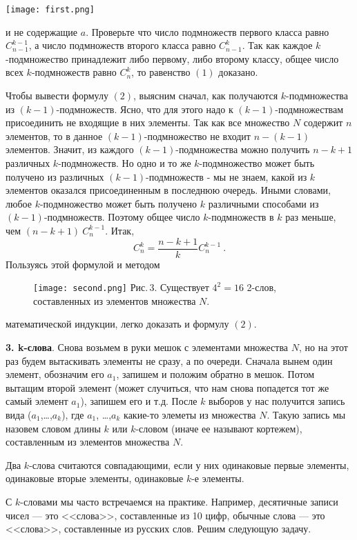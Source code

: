 \documentclass[11pt, a4paper, twocolumn]{report}
\begin{document}
\texttt{[image: first.png]}

 и не содержащие $a$. Проверьте что число подмножеств первого класса равно $C^{k-1}_{n-1}$, а число подмножеств второго класса равно $C^k_{n-1}$. Так как каждое $k$-подмножество принадлежит либо первому, либо второму классу, общее число всех $k$-подмножеств равно $C^k_n$, то равенство $ (1) $ доказано.

Чтобы вывести формулу $ (2) $, выясним сначал, как получаются $k$-подмножества из $(k-1)$-подмножеств. Ясно, что для этого надо к $(k-1)$-подмножествам присоединить не входящие в них элементы. Так как все множество $N$ содержит $n$ элементов, то в данное $(k-1)$-подмножество не входит $n-(k-1)$ элементов. Значит, из каждого $(k - 1)$-подмножества можно получить $n - k + 1$ различных $k$-подмножеств. Но одно и то же $k$-подмножество может быть получено из различных $(k - 1)$-подмножеств - мы не знаем, какой из $k$ элементов оказался присоединенным в последнюю очередь. Иными словами, любое $k$-подмножество может быть получено $k$ различными способами из $(k - 1)$-подмножеств. Поэтому общее число $k$-подмножеств в $k$ раз меньше, чем $(n - k +1)~ C^{k-1}_n$. Итак,
\[C^k_n = \frac{n-k+1}{k}C^{k-1}_{n}~.\]
Пользуясь этой формулой и методом


\begin{figure}[t]
\texttt{[image: second.png]}
\footnotesize
Рис.\,3. Существует $4^2 = 16$ 2-слов, составленных из элементов множества $N$.
\end{figure}

\noindent математической индукции, легко доказать и формулу $ (2) $.

\textbf{3. k-слова}. Снова возьмем в руки мешок с элементами множества $N$, но на этот раз будем вытаскивать элементы не сразу, а по очереди. Сначала вынем один элемент, обозначим его $a_1$, запишем и положим обратно в мешок. Потом вытащим второй элемент (может случиться, что нам снова попадется тот же самый элемент $a_1$), запишем его и т.д. После $k$ выборов у нас получится запись вида ($a_1$,\dots,$a_k$), где $a_1$, \dots,$a_k$ какие-то элеметы из множества $N$. Такую запись мы назовем словом длины $k$ или $k$-словом (иначе ее называют кортежем), составленным из элементов множества $N$.

Два $k$-слова считаются совпадающими, если у них одинаковые первые элементы, одинаковые вторые элементы, одинаковые $k$-е элементы.

С $k$-словами мы часто встречаемся на практике. Например, десятичные записи чисел --- это <<слова>>, составленные из 10 цифр, обычные слова --- это <<слова>>, составленные из русских слов. Решим следующую задачу.
\end{document}
